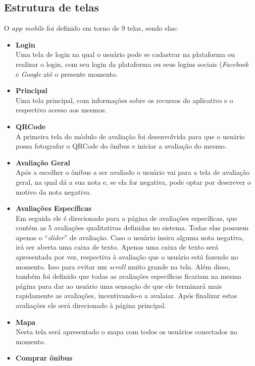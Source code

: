 \subsection{Estrutura de telas}
O \textit{app mobile} foi definido em torno de 9 telas, sendo elas:
\begin{itemize}
    \item \textbf{Login} \hfill \\
    Uma tela de login na qual o usuário pode se cadastrar na plataforma ou realizar o login, com seu login da plataforma ou seus logins sociais (\textit{Facebook} e \textit{Google} até o presente momento.
    \item \textbf{Principal} \hfill \\
    Uma tela principal, com informações sobre os recursos do aplicativo e o respectivo acesso aos mesmos.
    \item \textbf{QRCode} \hfill \\
    A primeira tela do módulo de avaliação foi desenvolvida para que o usuário possa fotografar o QRCode do ônibus e iniciar a avaliação do mesmo.
    \item \textbf{Avaliação Geral} \hfill \\
    Após a escolher o ônibus a ser avaliado o usuário vai para a tela de avaliação geral, na qual dá a sua nota e, se ela for negativa, pode optar por descrever o motivo da nota negativa.
    \item \textbf{Avaliações Específicas} \hfill \\
    Em seguida ele é direcionado para a página de avaliações específicas, que contém as 5 avaliações qualitativas definidas no sistema. Todas elas possuem apenas o ``\textit{slider}'' de avaliação. Caso o usuário insira alguma nota negativa, irá ser aberta uma caixa de texto. Apenas uma caixa de texto será apresentada por vez, respectiva à avaliação que o usuário está fazendo no momento. Isso para evitar um \textit{scroll} muito grande na tela. Além disso, também foi definido que todas as avaliações específicas ficariam na mesma página para dar ao usuário uma sensação de que ele terminará mais rapidamente as avaliações, incentivando-o a avalaiar. Após finalizar estas avaliações ele será direcionado à página principal.
    \item \textbf{Mapa} \hfill \\
    Nesta tela será apresentado o mapa com todos os usuários conectados no momento.
    \item \textbf{Comprar ônibus} \hfill \\

\end{itemize}
